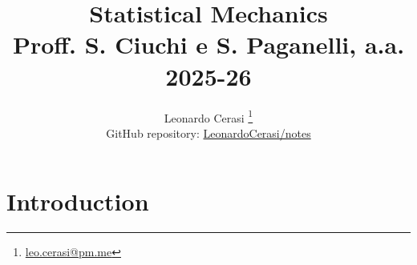 \documentclass[a4paper, 12pt]{book}
\title{\Huge\textbf{Statistical Mechanics} \\ \large Proff. S. Ciuchi e S. Paganelli, a.a. 2025-26}
\author{Leonardo Cerasi%
	\thanks{\scriptsize\href{mailto:leo.cerasi@pm.me}{leo.cerasi@pm.me}} \\
	\small GitHub repository: \href{https://github.com/LeonardoCerasi/notes}{LeonardoCerasi/notes}}
\date{}
\begin{document}
\frontmatter

\maketitle

\toc

\pagestyle{contents}

\mainmatter

\pagestyle{introd}
\chapter{Introduction}

\end{document}
